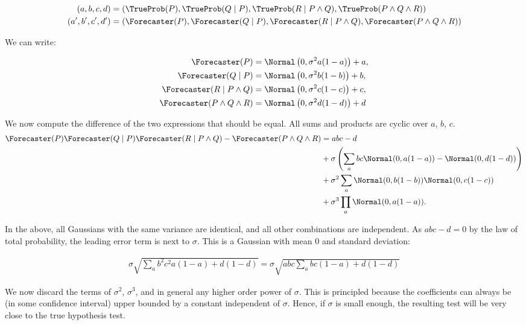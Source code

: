 \begin{align*}
(a, b, c, d) &= \left(\TrueProb(P), \TrueProb(Q \mid P), \TrueProb(R \mid P \wedge Q), \TrueProb(P \wedge Q \wedge R)\right) \\
(a', b', c', d') &= \left(\Forecaster(P), \Forecaster(Q \mid P), \Forecaster(R \mid P \wedge Q), \Forecaster(P \wedge Q \wedge R)\right)
\end{align*}

We can write:

\begin{align*}
    \Forecaster(P) &= \Normal\left(0, \sigma^2 a (1 - a)\right) + a, \\
    \Forecaster(Q\mid P) &= \Normal\left(0, \sigma^2 b (1 - b)\right) + b, \\
    \Forecaster(R \mid P \wedge Q) &= \Normal\left(0, \sigma^2 c (1 - c)\right) + c, \\
    \Forecaster(P \wedge Q \wedge R) &= \Normal\left(0, \sigma^2 d (1 - d)\right) + d
\end{align*}

We now compute the difference of the two expressions that should be equal.
All sums and products are cyclic over $a$, $b$, $c$.
\begin{align*}
    \Forecaster(P) \Forecaster(Q \mid P) \Forecaster(R \mid P \wedge Q) - \Forecaster(P \wedge Q \wedge R)
    &= abc - d \\
    &+ \sigma \left( \sum_{a} bc \Normal(0, a(1-a)) - \Normal(0, d(1-d))\right) \\
    &+ \sigma^2 \sum_{a} \Normal(0, b(1-b)) \Normal(0, c(1-c)) \\
    &+ \sigma^3 \prod_{a} \Normal(0, a(1-a)).
\end{align*}

In the above, all Gaussians with the same variance are identical, and all other combinations are independent.
As $abc - d = 0$ by the law of total probability, the leading error term is next to $\sigma$.
This is a Gaussian with mean 0 and standard deviation:

\begin{align*}
    \sigma \sqrt{\sum_{a} b^2c^2 a(1-a) + d(1-d)}
    =
    \sigma \sqrt{abc \sum_{a} bc (1-a) + d(1-d)}
\end{align*}



We now discard the terms of $\sigma^2$, $\sigma^3$, and in general any higher order power of $\sigma$. This is principled because the coefficients can always be (in some confidence interval) upper bounded by a constant independent of $\sigma$.
Hence, if $\sigma$ is small enough, the resulting test will be very close to the true hypothesis test.



